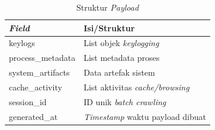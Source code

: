 \begin{table}[H]
    \centering
    \captionsetup{justification=raggedright,singlelinecheck=false}
    \begin{tabular}{ | p{4cm} | p{9cm} | }
        \hline
        \textbf{\textit{Field}} & \textbf{Isi/Struktur} \\
        \hline
        keylogs & List objek \textit{keylogging} \\ 
        \hline
        process\_metadata & List metadata proses \\ 
        \hline
        system\_artifacts & Data artefak sistem \\ 
        \hline
        cache\_activity & List aktivitas \textit{cache/browsing} \\ 
        \hline
        session\_id & ID unik \textit{batch crawling} \\ 
        \hline
        generated\_at & \textit{Timestamp} waktu payload dibuat \\ 
        \hline
    \end{tabular}
    \caption{Struktur \textit{Payload}}
    \label{tbl:struktur-payload}
\end{table}